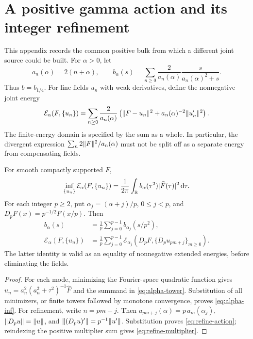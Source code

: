 \section{A positive gamma action and its integer refinement}\label{app:gamma}
This appendix records the common positive bulk from which a different
joint source could be built. For $\alpha>0$, let
\begin{equation}\label{eq:alpha-tower}
 a_n(\alpha)=2(n+\alpha),\qquad
 b_\alpha(s)=\sum_{n\geq0}\frac2{a_n(\alpha)}
                   \frac{s}{a_n(\alpha)^2+s}.
\end{equation}
Thus $b=b_{1/4}$. For line fields $u_n$ with weak derivatives, define
the nonnegative joint energy
\begin{equation}\label{eq:alpha-action}
 \mathcal E_\alpha(F,\{u_n\})
 =\sum_{n\geq0}\frac2{a_n(\alpha)}
 \left(\lVert F-u_n\rVert^2+a_n(\alpha)^{-2}\lVert u_n'\rVert^2\right).
\end{equation}
The finite-energy domain is specified by the sum as a whole.
In particular, the divergent expression
$\sum_n2\lVert F\rVert^2/a_n(\alpha)$ must not be split off as a separate
energy from compensating fields.

\begin{proposition}\label{prop:refinement}
For smooth compactly supported $F$,
\begin{equation}\label{eq:alpha-inf}
 \inf_{\{u_n\}}\mathcal E_\alpha(F,\{u_n\})
 =\frac1{2\pi}\int_\mathbb R b_\alpha(\tau^2)|\widehat F(\tau)|^2\,\mathrm d\tau.
\end{equation}
For each integer $p\geq2$, put $\alpha_j=(\alpha+j)/p$,
$0\leq j<p$, and $D_pF(x)=p^{-1/2}F(x/p)$. Then
\begin{align}
 b_\alpha(s)&=\frac1p\sum_{j=0}^{p-1}b_{\alpha_j}(s/p^2),
 \label{eq:refine-multiplier}\\
 \mathcal E_\alpha(F,\{u_n\})
 &=\frac1p\sum_{j=0}^{p-1}
   \mathcal E_{\alpha_j}
   (D_pF,\{D_pu_{pm+j}\}_{m\geq0}).
 \label{eq:refine-action}
\end{align}
The latter identity is valid as an equality of nonnegative extended
energies, before eliminating the fields.
\end{proposition}
\begin{proof}
For each mode, minimizing the Fourier-space quadratic function gives
$\widehat u_n=a_n^2(a_n^2+\tau^2)^{-1}\widehat F$ and the summand
in \eqref{eq:alpha-tower}. Substitution of all minimizers, or finite
towers followed by monotone convergence, proves \eqref{eq:alpha-inf}.
For refinement, write $n=pm+j$. Then
$a_{pm+j}(\alpha)=p\,a_m(\alpha_j)$,
$\lVert D_pu\rVert=\lVert u\rVert$, and
$\lVert (D_pu)'\rVert=p^{-1}\lVert u'\rVert$. Substitution proves
\eqref{eq:refine-action}; reindexing the positive multiplier sum gives
\eqref{eq:refine-multiplier}.
\end{proof}

